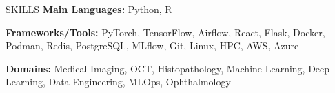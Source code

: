 \documentclass{resume} %
\begin{document}



\begin{rSection}{SKILLS}
\textbf{Main Languages:} Python, R

\textbf{Frameworks/Tools:} PyTorch, TensorFlow, Airflow, React, Flask, Docker, Podman, Redis, PostgreSQL, MLflow, Git, Linux, HPC, AWS, Azure

\textbf{Domains:} Medical Imaging, OCT, Histopathology, Machine Learning, Deep Learning, Data Engineering, MLOps, Ophthalmology

\end{rSection}
\end{document}
